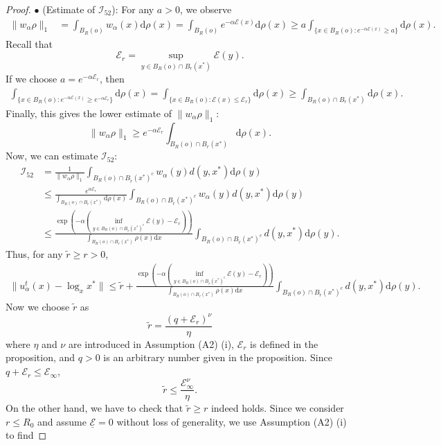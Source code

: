 \documentclass[11pt]{amsart}
\def\d{\mathrm{d}}
\newcommand{\p}{o}%
\newcommand{\dist}{d}%
\begin{document}
\begin{proof}
\noindent $\bullet$ (Estimate of $\mathcal I_{52}$): For any $a>0$, we observe
\begin{align*}
\|w_\alpha \rho\|_1 & = \int_{B_R(o)} w_\alpha(x)  \d\rho(x)  = \int_{B_R(o)} e^{-\alpha \mathcal E(x)}  \d\rho(x) \geq a \int_{ \{x\in B_R(o): e^{-\alpha \mathcal E(x)} \geq a\} }  \d\rho(x).
\end{align*}
Recall that
\[
\mathcal E_r = \sup_{y\in B_R(\p)\cap B_r(x^*)} \mathcal E(y).
\]
If we choose $a= e^{-\alpha \mathcal E_r}$, then 
\begin{align*}
\int_{ \{x\in B_R(\p): e^{-\alpha \mathcal E(x)}\geq e^{-\alpha \mathcal E_r}\} }  \d\rho(x)  = \int_{\{  x\in B_R(\p): \mathcal E(x) \leq \mathcal E_r  \} }   \d\rho(x)  \geq \int_{B_R(\p)\cap B_r(x^*)}   \d\rho(x) .  
\end{align*}
Finally, this gives the lower estimate of $\|w_\alpha   \rho\|_1$:
\[
\|w_\alpha \rho\|_1 \geq e^{-\alpha \mathcal E_r} \int_{B_R(\p)\cap B_r(x^*)} \d\rho(x) . 
\]
Now, we can estimate $\mathcal I_{52}$:
\begin{align*}
\mathcal I_{52} &= \frac{1}{\|w_\alpha   \rho\|_1}\int_ {B_R(\p)\cap B_{\tilde{r}}(x^*)^c}w_\alpha(y)  \dist(y, x^*)\d \rho(y) \\
&\leq \frac{e^{\alpha \mathcal{E}_r}}{\int_{B_R(\p)\cap B_r(x^*)}\d \rho(x)}\int_ {B_R(\p)\cap B_{\tilde{r}}(x^*)^c}w_\alpha(y)  \dist(y, x^*)\d \rho(y)\\
&\leq \frac{ \exp\left(-\alpha (  \inf_{y\in B_R(\p)\cap B_{\tilde r}(x^*)^c  } \mathcal E(y) - \mathcal E_r)\right)  }{  \int_{B_R(\p)\cap B_r(x^*)} \rho(x) \d x    } \int_{B_R(\p)\cap B_{\tilde{r}}(x^*)^c} d(y,x^*)  \d\rho(y) .
\end{align*}
Thus, for any $\tilde r\geq r>0$, 
\begin{align*}
\|u_\alpha^t(x)-\log_xx^* \|\leq \tilde r +  \frac{ \exp\left(-\alpha (  \inf_{y\in B_R(\p)\cap B_{\tilde r}(x^*)^c  } \mathcal E(y) - \mathcal E_r)\right)  }{  \int_{B_R(\p)\cap B_r(x^*)} \rho(x) \d x    } \int_{B_R(\p)\cap B_{\tilde{r}}(x^*)^c} d(y,x^*)  \d\rho(y) .
\end{align*}
Now we choose $\tilde r$ as
\[
\tilde r = \frac{(q+\mathcal E_r)^\nu}{\eta}
\]
where $\eta$ and $\nu$ are introduced in Assumption (A2) (i), $\mathcal E_r$ is defined in the proposition, and $q>0$ is an arbitrary number given in the proposition. Since $q+\mathcal E_r\leq \mathcal E_\infty$, 
\[
\tilde r \leq \frac{\mathcal E_\infty^\nu}{\eta}.
\]
On the other hand, we have to check that $\tilde r \geq r$ indeed holds. Since we consider $r\leq R_0$ and assume $\underline{\mathcal E}=0$ without loss of generality, we use Assumption (A2) (i) to find

\end{proof}
\end{document}
